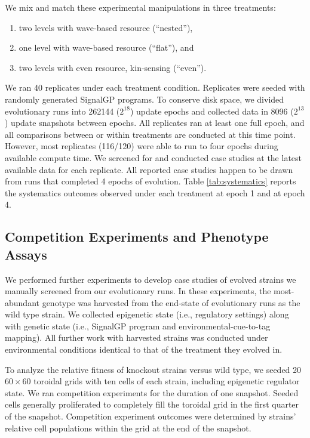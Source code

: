 We mix and match these experimental manipulations in three treatments:
\begin{enumerate}
\item two levels with wave-based resource (``nested''),
\item one level with wave-based resource (``flat''), and
\item two levels with even resource, kin-sensing (``even'').
\end{enumerate}

We ran 40 replicates under each treatment condition.
Replicates were seeded with randomly generated SignalGP programs.
To conserve disk space, we divided evolutionary runs into 262144 ($2^{18}$) update epochs and collected data in 8096 ($2^{13}$) update snapshots between epochs.
All replicates ran at least one full epoch, and all comparisons between or within treatments are conducted at this time point.
However, most replicates (116/120) were able to run to four epochs during available compute time.
We screened for and conducted case studies at the latest available data for each replicate.
All reported case studies happen to be drawn from runs that completed 4 epochs of evolution.
Table \ref{tab:systematics} reports the systematics outcomes observed under each treatment at epoch 1 and at epoch 4.

\subsection{Competition Experiments and Phenotype Assays}

We performed further experiments to develop case studies of evolved strains we manually screened from our evolutionary runs.
In these experiments, the most-abundant genotype was harvested from the end-state of evolutionary runs as the wild type strain.
We collected epigenetic state (i.e., regulatory settings) along with genetic state (i.e., SignalGP program and environmental-cue-to-tag mapping).
All further work with harvested strains was conducted under environmental conditions identical to that of the treatment they evolved in.

To analyze the relative fitness of knockout strains versus wild type, we seeded 20 $60 \times 60$ toroidal grids with ten cells of each strain, including epigenetic regulator state.
We ran competition experiments for the duration of one snapshot.
Seeded cells generally proliferated to completely fill the toroidal grid in the first quarter of the snapshot.
Competition experiment outcomes were determined by strains' relative cell populations within the grid at the end of the snapshot.

